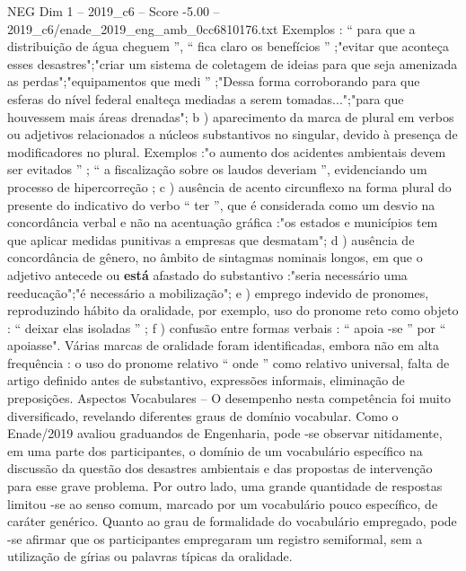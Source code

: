 \begin{textsample}{NEG Dim 1 – 2019\_c6 – Score -5.00 – 2019\_c6/enade\_2019\_eng\_amb\_0cc6810176.txt}
Exemplos : “ para que a distribuição de água cheguem ”, “ fica claro os benefícios ” ;"evitar que aconteça esses desastres";"criar um sistema de coletagem de ideias para que seja amenizada as perdas";"equipamentos que medi ” ;"Dessa forma corroborando para que esferas do nível federal enalteça mediadas a serem tomadas...";"para que houvessem mais áreas drenadas"; b ) aparecimento da marca de plural em verbos ou adjetivos relacionados a núcleos substantivos no singular, devido à presença de modificadores no plural.
Exemplos :"o aumento dos acidentes ambientais devem ser evitados ” ; “ a fiscalização sobre os laudos deveriam ”, evidenciando um processo de hipercorreção ; c ) ausência de acento circunflexo na forma plural do presente do indicativo do verbo “ ter ”, que é considerada como um desvio na concordância verbal e não na acentuação gráfica :"os estados e municípios tem que aplicar medidas punitivas a empresas que desmatam"; d ) ausência de concordância de gênero, no âmbito de sintagmas nominais longos, em que o adjetivo antecede ou \textbf{está} afastado do substantivo :"seria necessário uma reeducação";"é necessário a mobilização"; e ) emprego indevido de pronomes, reproduzindo hábito da oralidade, por exemplo, uso do pronome reto como objeto : “ deixar elas isoladas ” ; f ) confusão entre formas verbais : “ apoia -se ” por “ apoiasse".
Várias marcas de oralidade foram identificadas, embora não em alta frequência : o uso do pronome relativo “ onde ” como relativo universal, falta de artigo definido antes de substantivo, expressões informais, eliminação de preposições.
Aspectos Vocabulares – O desempenho nesta competência foi muito diversificado, revelando diferentes graus de domínio vocabular.
Como o Enade/2019 avaliou graduandos de Engenharia, pode -se observar nitidamente, em uma parte dos participantes, o domínio de um vocabulário específico na discussão da questão dos desastres ambientais e das propostas de intervenção para esse grave problema.
Por outro lado, uma grande quantidade de respostas limitou -se ao senso comum, marcado por um vocabulário pouco específico, de caráter genérico.
Quanto ao grau de formalidade do vocabulário empregado, pode -se afirmar que os participantes empregaram um registro semiformal, sem a utilização de gírias ou palavras típicas da oralidade.

\end{textsample}

